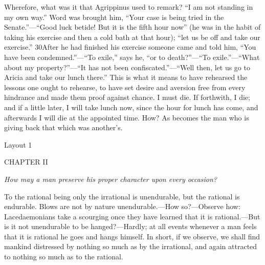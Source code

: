 Wherefore, what was it that Agrippinus used to remark? ``I am not standing in my own way.'' Word was brought him, ``Your case is being tried in the Senate.''—``Good luck betide! But it is the fifth hour now'' (he was in the habit of taking his exercise and then a cold bath at that hour); ``let us be off and take our exercise.'' 30After he had finished his exercise someone came and told him, ``You have been condemned.''—``To exile,'' says he, ``or to death?''—``To exile.''—``What about my property?''—``It has not been confiscated.''—``Well then, let us go to Aricia and take our lunch there.'' This is what it means to have rehearsed the lessons one ought to rehearse, to have set desire and aversion free from every hindrance and made them proof against chance. I must die. If forthwith, I die; and if a little later, I will take lunch now, since the hour for lunch has come, and afterwards I will die at the appointed time. How? As becomes the man who is giving back that which was another's.



Layout 1

CHAPTER II

\emph{How may a man preserve his proper character upon every occasion?}

To the rational being only the irrational is unendurable, but the rational is endurable. Blows are not by nature unendurable.—How so?—Observe how: Lacedaemonians take a scourging once they have learned that it is rational.—But is it not unendurable to be hanged?—Hardly; at all events whenever a man feels that it is rational he goes and hangs himself. In short, if we observe, we shall find mankind distressed by nothing so much as by the irrational, and again attracted to nothing so much as to the rational.

